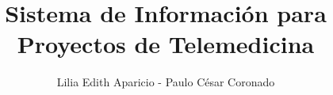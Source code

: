 \documentclass[11pt]{report}
\title{Sistema de Información para Proyectos de Telemedicina}
\author{Lilia Edith Aparicio - Paulo César Coronado}
\begin{document}
\renewcommand{\tablename}{Tabla}
\renewcommand{\listtablename}{Índice de tablas}
\renewcommand{\appendixname}{Anexo}
\tableofcontents







\begin{appendices}










\end{appendices}
\end{document}

